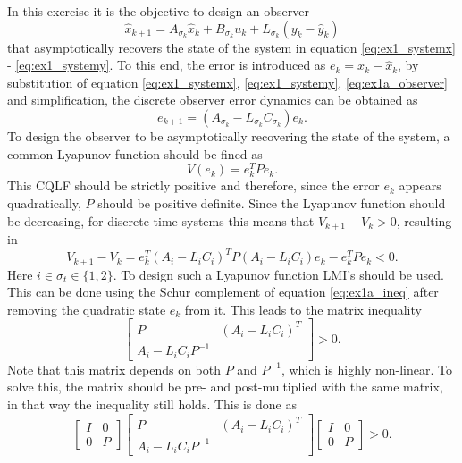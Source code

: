 In this exercise it is the objective to design an observer
\begin{equation}
    \hat{x}_{k+1} = A_{\sigma_k} \hat{x}_k + B_{\sigma_k}u_k + L_{\sigma_k} (y_k - \hat{y}_k)
    \label{eq:ex1a_observer}
\end{equation}
that asymptotically recovers the state of the system in equation \eqref{eq:ex1_systemx} - \eqref{eq:ex1_systemy}. To this end, the error is introduced as $e_k= x_k - \hat{x}_k$, by substitution of equation \eqref{eq:ex1_systemx}, \eqref{eq:ex1_systemy}, \eqref{eq:ex1a_observer} and simplification, the discrete observer error dynamics can be obtained as
\begin{equation}
    e_{k+1} = (A_{\sigma_k} - L_{\sigma_k} C_{\sigma_k}) e_k.
    \label{eq:ex1a_errordynamics}
\end{equation}
To design the observer to be asymptotically recovering the state of the system, a common Lyapunov function should be fined as
\begin{equation}
    V(e_k) = e_k^T P e_k.
    \label{eq:ex1a_CQLF}
\end{equation}
This CQLF should be strictly positive and therefore, since the error $e_k$ appears quadratically, $P$ should be positive definite. Since the Lyapunov function should be decreasing, for discrete time systems this means that $V_{k+1} - V_k > 0$, resulting in
\begin{equation}
    V_{k+1} - V_k = e_k^T (A_i - L_i C_i)^T P (A_i - L_i C_i)e_k - e_k^T P e_k < 0.
    \label{eq:ex1a_ineq}
\end{equation}
Here $i \in \sigma_t \in \{1,2\}$. To design such a Lyapunov function LMI's should be used. This can be done using the Schur complement of equation \eqref{eq:ex1a_ineq} after removing the quadratic state $e_k$ from it. This leads to the matrix inequality
\begin{equation}
    \begin{bmatrix} P & (A_i - L_i C_i)^T \\ A_i - L_i C_i P^{-1} \end{bmatrix} > 0.
\end{equation}
Note that this matrix depends on both $P$ and $P^{-1}$, which is highly non-linear. To solve this, the matrix should be pre- and post-multiplied with the same matrix, in that way the inequality still holds. This is done as
\begin{equation}
    \begin{bmatrix} I & 0 \\ 0 & P \end{bmatrix} 
    \begin{bmatrix} P & (A_i - L_i C_i)^T \\ A_i - L_i C_i P^{-1} \end{bmatrix}
    \begin{bmatrix} I & 0 \\ 0 & P \end{bmatrix} > 0.
\end{equation}
